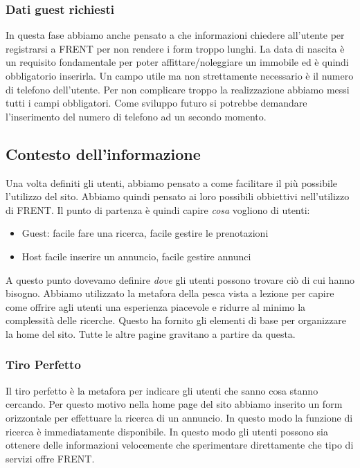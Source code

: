\documentclass[1_relazione.tex]{subfiles}
\begin{document}
\subsubsection{Dati guest richiesti}
In questa fase abbiamo anche pensato a che informazioni chiedere all'utente per registrarsi a FRENT per non rendere i form troppo lunghi. La data di nascita è un requisito fondamentale per poter affittare/noleggiare un immobile ed è quindi obbligatorio inserirla. Un campo utile ma non strettamente necessario è il numero di telefono dell'utente. Per non complicare troppo la realizzazione abbiamo messi tutti i campi obbligatori. Come sviluppo futuro si potrebbe demandare l'inserimento del numero di telefono ad un secondo momento. 

\subsection{Contesto dell'informazione }
Una volta definiti gli utenti, abbiamo pensato a come facilitare il più possibile l'utilizzo del sito. Abbiamo quindi pensato ai loro possibili obbiettivi nell'utilizzo di FRENT. Il punto di partenza è quindi capire \textit{cosa} vogliono di utenti:

\begin{itemize}
\item Guest: facile fare una ricerca, facile gestire le prenotazioni 
\item Host facile inserire un annuncio, facile gestire annunci
\end{itemize}

A questo punto dovevamo definire \textit{dove} gli utenti possono trovare ciò di cui hanno bisogno. Abbiamo utilizzato la metafora della pesca vista a lezione per capire come offrire agli utenti una esperienza piacevole e ridurre al minimo la complessità delle ricerche. Questo ha fornito gli elementi di base per organizzare la home del sito. Tutte le altre pagine gravitano a partire da questa. 

\subsubsection{Tiro Perfetto} 
Il tiro perfetto è la metafora per indicare gli utenti che sanno cosa stanno cercando. Per questo motivo nella home page del sito abbiamo inserito un form orizzontale per effettuare la ricerca di un annuncio. In questo modo la funzione di ricerca è immediatamente disponibile. In questo modo gli utenti possono sia ottenere delle informazioni velocemente che sperimentare direttamente che tipo di servizi offre FRENT.
 
\end{document}
